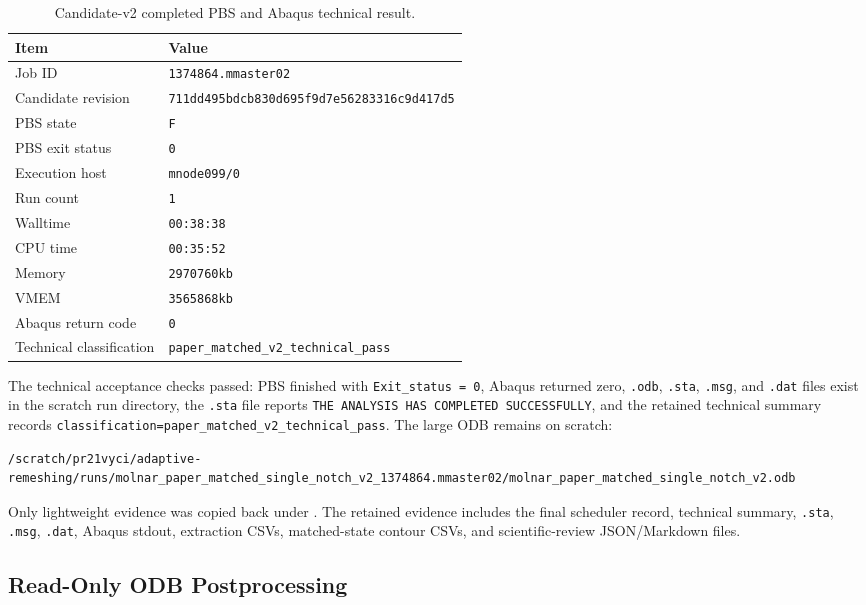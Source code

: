 \documentclass[11pt,a4paper]{article}
\begin{document}
\begin{table}[htbp]
\centering
\caption{Candidate-v2 completed PBS and Abaqus technical result.}
\begin{tabular}{@{}ll@{}}
\toprule
Item & Value \\
\midrule
Job ID & \texttt{1374864.mmaster02} \\
Candidate revision & \texttt{711dd495bdcb830d695f9d7e56283316c9d417d5} \\
PBS state & \texttt{F} \\
PBS exit status & \texttt{0} \\
Execution host & \texttt{mnode099/0} \\
Run count & \texttt{1} \\
Walltime & \texttt{00:38:38} \\
CPU time & \texttt{00:35:52} \\
Memory & \texttt{2970760kb} \\
VMEM & \texttt{3565868kb} \\
Abaqus return code & \texttt{0} \\
Technical classification & \texttt{paper\_matched\_v2\_technical\_pass} \\
\bottomrule
\end{tabular}
\end{table}

The technical acceptance checks passed: PBS finished with \texttt{Exit\_status = 0}, Abaqus returned zero, \texttt{.odb}, \texttt{.sta}, \texttt{.msg}, and \texttt{.dat} files exist in the scratch run directory, the \texttt{.sta} file reports \texttt{THE ANALYSIS HAS COMPLETED SUCCESSFULLY}, and the retained technical summary records \texttt{classification=paper\_matched\_v2\_technical\_pass}. The large ODB remains on scratch:

\begin{verbatim}
/scratch/pr21vyci/adaptive-remeshing/runs/molnar_paper_matched_single_notch_v2_1374864.mmaster02/molnar_paper_matched_single_notch_v2.odb
\end{verbatim}

Only lightweight evidence was copied back under . The retained evidence includes the final scheduler record, technical summary, \texttt{.sta}, \texttt{.msg}, \texttt{.dat}, Abaqus stdout, extraction CSVs, matched-state contour CSVs, and scientific-review JSON/Markdown files.

\subsection*{Read-Only ODB Postprocessing}
\end{document}
